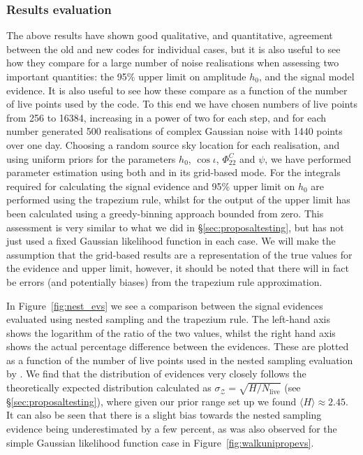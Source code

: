 \subsubsection{Results evaluation}\label{sec:reseval}

The above results have shown good qualitative, and quantitative, agreement between the old and new codes for individual cases, but it is also useful
to see how they compare for a large number of noise realisations when assessing two important quantities: the 95\% upper limit on \gw amplitude $h_0$,
and the signal model evidence. It is also useful to see how these compare as a function of the number of live points used by the code. To this end we
have chosen numbers of live points from 256 to 16384, increasing in a power of two for each step, and for each number generated 500 realisations of
complex Gaussian noise with 1440 points over one day. Choosing a random source sky location for each realisation, and using uniform priors for the
parameters $h_0$, $\cos{\iota}$, $\Phi_{22}^C$ and $\psi$, we have performed parameter estimation using both \lppen and \lppe in its grid-based mode.
For \lppe the integrals required for calculating the signal evidence and 95\% upper limit on $h_0$ are performed using the trapezium rule, whilst
for the output of \lppen the upper limit has been calculated using a greedy-binning approach bounded from zero. This assessment is very similar to what
we did in \S\ref{sec:proposaltesting}, but has not just used a fixed Gaussian likelihood function in each case. We will make the assumption that the
grid-based results are a representation of the true values for the evidence and upper limit, however, it should be noted that there will in fact be
errors (and potentially biases) from the trapezium rule approximation.

In Figure~\ref{fig:nest_evs} we see a comparison between the signal evidences evaluated using nested sampling and the trapezium rule. The left-hand
axis shows the logarithm of the ratio of the two values, whilst the right hand axis shows the actual percentage difference between the evidences. These
are plotted as a function of the number of live points used in the nested sampling evaluation by \lppen. We find that the distribution of evidences
very closely follows the theoretically expected distribution calculated as $\sigma_{\mathcal{Z}} = \sqrt{H/N_{\text{live}}}$ (see
\S\ref{sec:proposaltesting}), where given our prior range set up we found $\langle H \rangle \approx 2.45$. It can also be seen that there is a slight
bias towards the nested sampling evidence being underestimated by a few percent, as was also observed for the simple Gaussian likelihood function case
in Figure~\ref{fig:walkunipropevs}.

